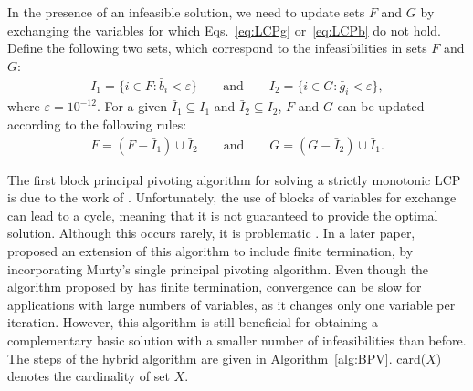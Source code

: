 \documentclass[11pt]{article}
\newcommand{\0}{\phantom{0}}
\begin{document}
In the presence of an infeasible solution, we need to update sets $F$ and $G$ by exchanging the variables for which Eqs.~\eqref{eq:LCPg} or~\eqref{eq:LCPb} do not hold. Define the following two sets, which correspond to the infeasibilities in sets $F$ and $G$:
\begin{align}
\label{eq:indexset}
I_{1} = \{i \in F: \bar{b}_{i} < \varepsilon\} \qquad \text{and} \qquad I_{2} = \{i \in G: \bar{g}_{i} < \varepsilon\},
\end{align}
where $\varepsilon = 10^{-12}$. For a given $\bar{I}_{1} \subseteq I_{1}$ and $\bar{I}_{2} \subseteq I_{2}$, $F$ and $G$ can be updated according to the following rules:
\begin{align}
\label{eq:indexsetrev}
F = (F - \bar{I}_{1}) \cup \bar{I}_{2} \qquad \text{and} \qquad G = (G - \bar{I}_{2}) \cup \bar{I}_{1}.
\end{align}

The first block principal pivoting algorithm for solving a strictly monotonic LCP is due to the work of \citet{Kost1978}. Unfortunately, the use of blocks of variables for exchange can lead to a cycle, meaning that it is not guaranteed to provide the optimal solution. Although this occurs rarely, it is problematic \citep{Judice1989}. In a later paper, \citet{Judice1994} proposed an extension of this algorithm to include finite termination, by incorporating Murty's single principal pivoting algorithm. Even though the algorithm proposed by \citet{Murty1974} has finite termination, convergence can be slow for applications with large numbers of variables, as it changes only one variable per iteration. However, this algorithm is still beneficial for obtaining a complementary basic solution with a smaller number of infeasibilities than before. The steps of the hybrid algorithm are given in Algorithm~\ref{alg:BPV}. card($X$) denotes the cardinality of set $X$.
\end{document}
